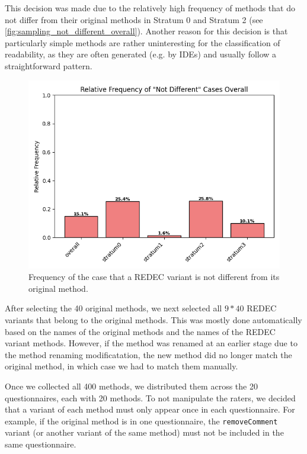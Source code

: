 \documentclass[%
class=scrreprt,
chapterprefix=false,%
open=right,%
twoside=false,%
paper=a4,%
logofile={Logo\_zentral\_farbig\_EN.png},%
thesistype=master,%
UKenglish,%
]{se2thesis}
\theoremstyle{definition}
\newcommand{\mod}{modificatation\xspace}
\newcommand{\rdh}{REDEC\xspace}
\begin{document}
	This decision was made due to the relatively high frequency of methods that do not differ from their original methods in Stratum 0 and Stratum 2 (see \autoref{fig:sampling_not_different_overall}). Another reason for this decision is that particularly simple methods are rather uninteresting for the classification of readability, as they are often generated (e.g. by IDEs) and usually follow a straightforward pattern.
	
	\begin{figure}[tb]
		\centering
		\includegraphics[width=\textwidth]{img/sampling_not_different_overall.png}
		\caption{Frequency of the case that a \rdh variant is not different from its original method.} 
		\label{fig:sampling_not_different_overall}
	\end{figure}
		
	After selecting the 40 original methods, we next selected all $9*40$ \rdh variants that belong to the original methods. This was mostly done automatically based on the names of the original methods and the names of the \rdh variant methods. However, if the method was renamed at an earlier stage due to the method renaming \mod, the new method did no longer match the original method, in which case we had to match them manually.
		
	Once we collected all 400 methods, we distributed them across the 20 questionnaires, each with 20 methods. To not manipulate the raters, we decided that a variant of each method must only appear once in each questionnaire. For example, if the original method is in one questionnaire, the \texttt{removeComment} variant (or another variant of the same method) must not be included in the same questionnaire.
		
\end{document}
